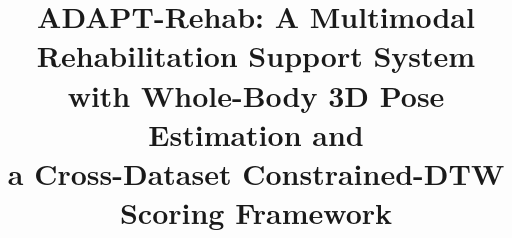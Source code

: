 \documentclass[conference]{IEEEtran}
\title{ADAPT-Rehab: A Multimodal Rehabilitation Support System\\with Whole-Body 3D Pose Estimation and\\a Cross-Dataset Constrained-DTW Scoring Framework}
\begin{document}
\maketitle










\balance


\end{document}
